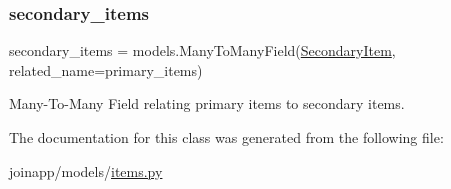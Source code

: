 \mbox{\label{classjoinapp_1_1models_1_1items_1_1_primary_item_a0cd125858c0f77f976fcb2a3c626392f}} 
\subsubsection{\texorpdfstring{secondary\_items}{secondary\_items}}
{\footnotesize\ttfamily secondary\+\_\+items = models.\+Many\+To\+Many\+Field(\mbox{\hyperlink{classjoinapp_1_1models_1_1items_1_1_secondary_item}{Secondary\+Item}}, related\+\_\+name=\textquotesingle{}primary\+\_\+items\textquotesingle{})\hspace{0.3cm}{\ttfamily [static]}}



Many-\/\+To-\/\+Many Field relating primary items to secondary items. 



The documentation for this class was generated from the following file\+:\begin{DoxyCompactItemize}
\item 
joinapp/models/\mbox{\hyperlink{items_8py}{items.\+py}}\end{DoxyCompactItemize}
